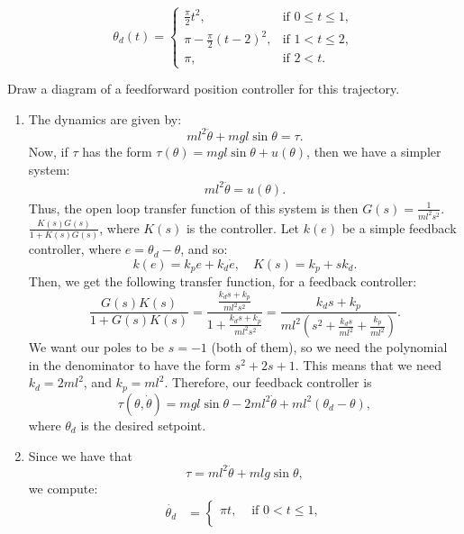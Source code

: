 \documentclass[11pt]{article}
\begin{document}
\begin{equation}
\theta_d(t)=
\begin{cases}
\frac{\pi}{2} t^2, & \text{if } 0 \le t \le 1,\\[0.5em]
\pi - \frac{\pi}{2}(t-2)^2, & \text{if } 1 < t \le 2,\\[0.5em]
\pi, & \text{if } 2 < t.
\end{cases}
\end{equation}

\noindent Draw a diagram of a feedforward position controller for this trajectory.

\vspace{1em}

\begin{enumerate}
    \item[(i)] The dynamics are given by:
        \[
            ml^2 \ddot{\theta} + mgl \sin\theta = \tau
        .\] 
        Now, if $\tau$ has the form $\tau(\theta)= mgl \sin\theta + u(\theta)$, then we have a simpler system:
        \begin{align*}
            ml^2 \ddot{\theta} = u(\theta)
        .\end{align*}
        Thus, the open loop transfer function of this system is then $G(s) = \frac{1}{ml^2 s^2} $.
        $\frac{K(s)G(s)}{1 + K(s)G(s)}$, where $K(s)$ is the controller.
        Let $k(e)$ be a simple feedback controller, where $e = \theta_d - \theta$, and so:
        \[
            k(e) = k_p e + k_d \dot{e}, \quad K(s) = k_p + s k_d
        .\] 
        Then, we get the following transfer function, for a feedback controller:
        \[
        \frac{G(s)K(s)}{1 + G(s)K(s)} = \frac{\frac{k_d s+k_p}{ml^2 s^2}}{1 + \frac{k_d s+k_p}{ml^2 s^2}} =  \frac{k_d s+k_p}{ml^2 (s^2+\frac{k_d s}{ml^2} +\frac{k_p}{ml^2})}
        .\] 
        We want our poles to be $s=-1$ (both of them), so we need the polynomial in the denominator to have the form $s^2 + 2s + 1$.
        This means that we need $k_d = 2 ml^2$, and $k_p = ml^2$.
        Therefore, our feedback controller is
        \[
            \tau(\theta, \dot{\theta}) = mgl \sin\theta - 2 ml^2 \dot{\theta} + ml^2(\theta_d - \theta)
        ,\] 
        where $\theta_d$ is the desired setpoint.
    \item[(ii)]
        Since we have that
        \[
            \tau = ml^2 \ddot{\theta} + mlg \sin\theta
        ,\] 
        we compute:
        \begin{align*}
            \dot{\theta_d} &= \begin{cases}
                \pi t, & \text{ if } 0 < t \leq 1,\\

\end{cases}
\end{align*}
\end{enumerate}
\end{document}
